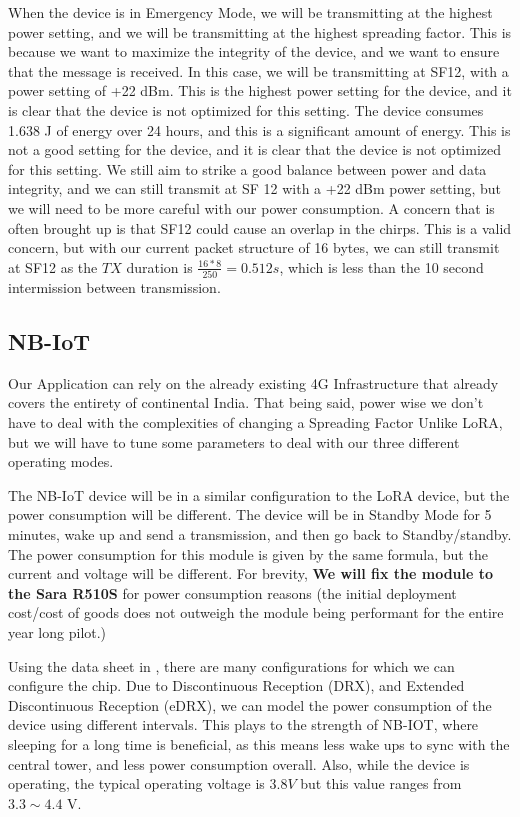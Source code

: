 When the device is in Emergency Mode, we will be transmitting at the highest power setting, and we will be transmitting at the highest spreading factor. This is because we want to maximize the integrity of the device, and we want to ensure that the message is received. In this case, we will be transmitting at SF12, with a power setting of +22 dBm. This is the highest power setting for the device, and it is clear that the device is not optimized for this setting. The device consumes 1.638 J of energy over 24 hours, and this is a significant amount of energy. This is not a good setting for the device, and it is clear that the device is not optimized for this setting. We still aim to strike a good balance between power and data integrity, and we can still transmit at SF 12 with a +22 dBm power setting, but we will need to be more careful with our power consumption. A concern that is often brought up is that SF12 could cause an overlap in the chirps. This is a valid concern, but with our current packet structure of 16 bytes, we can still transmit at SF12 as the $TX$ duration is $\frac{16 * 8}{250} = 0.512 s$, which is less than the 10 second intermission between transmission.




\subsection{NB-IoT}
\label{sec:NB-IoT}

Our Application can rely on the already existing 4G Infrastructure that already covers the entirety of continental India. That being said, power wise we don't have to deal with the complexities of changing a Spreading Factor Unlike LoRA, but we will have to tune some parameters to deal with our three different operating modes. 

The NB-IoT device will be in a similar configuration to the LoRA device, but the power consumption will be different. The device will be in Standby Mode for 5 minutes, wake up and send a transmission, and then go back to Standby/standby. The power consumption for this module is given by the same formula, but the current and voltage will be different. For brevity, \textbf{We will fix the module to the Sara R510S} for power consumption reasons (the initial deployment cost/cost of goods does not outweigh the module being performant for the entire year long pilot.)

Using the data sheet in \cite{nbPower}, there are many configurations for which we can configure the chip. Due to Discontinuous Reception (DRX), and Extended Discontinuous Reception (eDRX), we can model the power consumption of the device using different intervals. This plays to the strength of NB-IOT, where sleeping for a long time is beneficial, as this means less wake ups to sync with the central tower, and less power consumption overall. Also, while the device is operating, the typical operating voltage is $3.8V$ but this value ranges from $3.3 \sim 4.4$ V.

